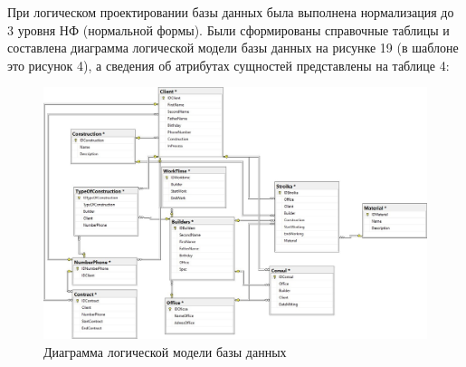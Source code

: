 \documentclass{../SIBGU-state}
\begin{document}
При логическом проектировании базы данных была выполнена нормализация до 3 уровня НФ (нормальной формы). Были сформированы справочные таблицы и составлена диаграмма логической модели базы данных на рисунке 19 (в шаблоне это рисунок 4), а сведения об атрибутах сущностей представлены на таблице 4: \par
\begin{figure}[htb]
	\centering
	\includegraphics[width=1\textwidth]{ris/ris4.jpg}
	\parskip=1pt
	\caption{Диаграмма логической модели базы данных}
	\label{fig:in_appendix}
\end{figure}\par
\end{document}
